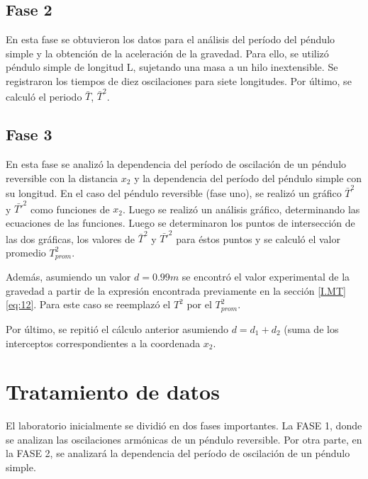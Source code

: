 \documentclass[spanish,notitlepage,letterpaper, 12pt]{article}
\begin{document}
\subsection{Fase 2}
En esta fase se obtuvieron los datos para el análisis del período del péndulo simple y la obtención de la aceleración de la gravedad. Para ello, se utilizó péndulo simple de longitud L, sujetando una masa a un hilo inextensible. Se registraron los tiempos de diez oscilaciones para siete longitudes. Por último, se calculó el periodo $\bar{T}$, $\bar{T}^2$.
\subsection{Fase 3}
En esta fase se analizó la dependencia del período de oscilación de un
péndulo reversible con la distancia $x_2$ y la dependencia del período del péndulo simple
con su longitud. En el caso del péndulo reversible (fase uno), se realizó un gráfico $\bar{T}^2$ y $\bar{T\prime}^2$ como funciones de $x_2$. Luego se realizó un análisis
gráfico, determinando las ecuaciones de las funciones. Luego se determinaron los puntos de intersección de las dos gráficas, los valores de $\bar{T}^2$ y $\bar{T\prime}^2$ para éstos puntos y se calculó el valor promedio $T_{prom}^2$. \par
\bigskip
Además, asumiendo un valor $d=0.99m$ se encontró el valor experimental de la gravedad a partir de la expresión encontrada previamente en la sección \ref{I.MT} \eqref{eq:12}. Para este caso se reemplazó el $T^2$ por el $T_{prom}^2$. \par
\bigskip
Por último, se repitió el cálculo anterior asumiendo $d=d_1+d_2$ (suma de los
interceptos correspondientes a la coordenada $x_2$.
\section{Tratamiento de datos} \label{TD}
El laboratorio inicialmente se dividió en dos fases importantes. La FASE 1, donde se analizan las oscilaciones armónicas de un péndulo reversible. Por otra parte, en la FASE 2, se analizará la dependencia del período de oscilación de un péndulo simple.
\end{document}
